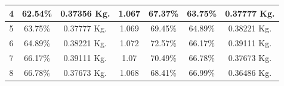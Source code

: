 \begin{longtable}{|p{1cm}|p{1.7cm}|p{2cm}|p{2cm}|p{2cm}| p{1cm}| p{1cm}|}
             \\
             \hline
             
             \multicolumn{1}{|c|}{4} 
             & \multicolumn{1}{c|}{62.54\%}  %
             & \multicolumn{1}{c|}{0.37356 Kg.} %
             & \multicolumn{1}{c|}{1.067} %
             & \multicolumn{1}{c|}{67.37\%} %
             & \multicolumn{1}{c|}{63.75\%} %
             & \multicolumn{1}{c|}{0.37777 Kg.} %
             
             \\
             \hline
             
             \multicolumn{1}{|c|}{5} 
             & \multicolumn{1}{c|}{63.75\%} 
             & \multicolumn{1}{c|}{0.37777 Kg.}
             & \multicolumn{1}{c|}{1.069}
             & \multicolumn{1}{c|}{69.45\%}
             & \multicolumn{1}{c|}{64.89\%} 
             & \multicolumn{1}{c|}{0.38221 Kg.} 

             \\
             \hline
             
             \multicolumn{1}{|c|}{6} 
             & \multicolumn{1}{c|}{64.89\%}  
             & \multicolumn{1}{c|}{0.38221 Kg.} 
             & \multicolumn{1}{c|}{1.072}
             & \multicolumn{1}{c|}{72.57\%}
             & \multicolumn{1}{c|}{66.17\%} 
             &\multicolumn{1}{c|}{0.39111 Kg.} 

             \\
             \hline
             
             \multicolumn{1}{|c|}{7} 
             & \multicolumn{1}{c|}{66.17\%}  
             & \multicolumn{1}{c|}{0.39111 Kg.} 
             & \multicolumn{1}{c|}{1.07}
             & \multicolumn{1}{c|}{70.49\%}
             & \multicolumn{1}{c|}{66.78\%} 
             & \multicolumn{1}{c|}{0.37673 Kg.} 
             \\
             \hline
             
             \multicolumn{1}{|c|}{8} 
             & \multicolumn{1}{c|}{66.78\%}  
             & \multicolumn{1}{c|}{0.37673 Kg.}
             & \multicolumn{1}{c|}{1.068}
             & \multicolumn{1}{c|}{68.41\%}
             & \multicolumn{1}{c|}{66.99\%} 
             & \multicolumn{1}{c|}{0.36486 Kg.} 
             
             \\
             \hline
             

\end{longtable}
